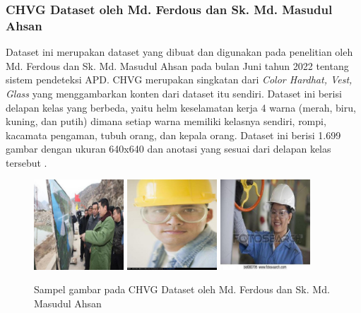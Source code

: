 \subsubsection{CHVG Dataset oleh Md. Ferdous dan Sk. Md. Masudul Ahsan}
\label{chvgdataset}

\par Dataset ini merupakan dataset yang dibuat dan digunakan pada penelitian oleh Md. Ferdous dan Sk. Md. Masudul Ahsan pada bulan Juni tahun 2022 tentang sistem pendeteksi APD.
CHVG merupakan singkatan dari \textit{Color Hardhat, Vest, Glass} yang menggambarkan konten dari dataset itu sendiri. Dataset ini berisi delapan kelas yang berbeda, yaitu helm keselamatan kerja 4 warna (merah, biru, kuning, dan putih) dimana setiap warna memiliki kelasnya sendiri, rompi, kacamata pengaman, tubuh orang, dan kepala orang.
Dataset ini berisi 1.699 gambar dengan ukuran 640x640 dan anotasi yang sesuai dari delapan kelas tersebut \cite{Ferdous2022}.

\begin{figure}[ht]
  \centering
  \includegraphics[width=0.3\textwidth]{gambar/chvg1}
  \includegraphics[width=0.3\textwidth]{gambar/chvg2}
  \includegraphics[width=0.3\textwidth]{gambar/chvg3}
  \caption{Sampel gambar pada CHVG Dataset oleh Md. Ferdous dan Sk. Md. Masudul Ahsan}
  \label{fig:datasetapdpreview}
\end{figure}

